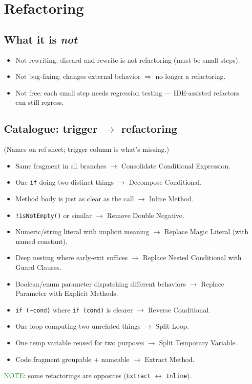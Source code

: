 \section{Refactoring}

\subsection{What it is \emph{not}}
\begin{itemize}
  \item \textcolor{Bittersweet}{Not rewriting}: discard-and-rewrite is not refactoring (must be small steps).
  \item \textcolor{Bittersweet}{Not bug-fixing}: changes external behavior $\Rightarrow$ no longer a refactoring.
  \item \textcolor{Bittersweet}{Not free}: each small step needs regression testing — IDE-assisted refactors can still regress.
\end{itemize}

\subsection{Catalogue: trigger $\to$ refactoring}
(Names on ref sheet; trigger column is what's missing.)
\begin{itemize}
  \item Same fragment in all branches $\to$ \textcolor{Bittersweet}{Consolidate Conditional Expression}.
  \item One \texttt{if} doing two distinct things $\to$ \textcolor{Bittersweet}{Decompose Conditional}.
  \item Method body is just as clear as the call $\to$ \textcolor{Bittersweet}{Inline Method}.
  \item \texttt{!isNotEmpty()} or similar $\to$ \textcolor{Bittersweet}{Remove Double Negative}.
  \item Numeric/string literal with implicit meaning $\to$ \textcolor{Bittersweet}{Replace Magic Literal} (with named constant).
  \item Deep nesting where early-exit suffices $\to$ \textcolor{Bittersweet}{Replace Nested Conditional with Guard Clauses}.
  \item Boolean/enum parameter dispatching different behaviors $\to$ \textcolor{Bittersweet}{Replace Parameter with Explicit Methods}.
  \item \texttt{if (\textasciitilde{}cond)} where \texttt{if (cond)} is clearer $\to$ \textcolor{Bittersweet}{Reverse Conditional}.
  \item One loop computing two unrelated things $\to$ \textcolor{Bittersweet}{Split Loop}.
  \item One temp variable reused for two purposes $\to$ \textcolor{Bittersweet}{Split Temporary Variable}.
  \item Code fragment groupable + nameable $\to$ \textcolor{Bittersweet}{Extract Method}.
\end{itemize}
\textcolor{ForestGreen}{NOTE}: some refactorings are opposites (\texttt{Extract} $\leftrightarrow$ \texttt{Inline}).

